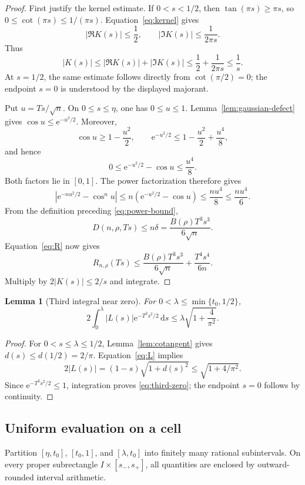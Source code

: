 \documentclass[11pt,a4paper,twoside]{article}
\newcommand{\manualtag}[1]{\tag{#1}}
\newtheorem{lemma}[theorem]{Lemma}
\theoremstyle{remark}
\newcommand{\e}{\mathrm{e}}
\newcommand{\dd}{\,\mathrm{d}}
\newcommand{\abs}[1]{\lvert#1\rvert}
\begin{document}
\begin{proof}
First justify the kernel estimate.  If \(0<s<1/2\), then
\(\tan(\pi s)\ge\pi s\), so
\(0\le\cot(\pi s)\le1/(\pi s)\).  Equation~\eqref{eq:kernel}
gives
\[
 \abs{\Re K(s)}\le\frac12,
 \qquad
 \abs{\Im K(s)}\le\frac1{2\pi s}.
\]
Thus
\[
 \abs{K(s)}
 \le\abs{\Re K(s)}+\abs{\Im K(s)}
 \le\frac12+\frac1{2\pi s}\le\frac1s.
\]
At \(s=1/2\), the same estimate follows directly from
\(\cot(\pi/2)=0\); the endpoint \(s=0\) is understood by the displayed
majorant.

Put \(u=Ts/\sqrt n\).  On \(0\le s\le\eta\), one has
\(0\le u\le1\).  Lemma~\ref{lem:gaussian-defect} gives
\(\cos u\le\e^{-u^2/2}\).  Moreover,
\[
 \cos u\ge1-\frac{u^2}{2},
 \qquad
 \e^{-u^2/2}
 \le
 1-\frac{u^2}{2}+\frac{u^4}{8},
\]
and hence
\[
 0\le\e^{-u^2/2}-\cos u\le\frac{u^4}{8}.
\]
Both factors lie in \([0,1]\).  The power factorization therefore gives
\[
 \left|\e^{-nu^2/2}-\cos^n u\right|
 \le
 n\left(\e^{-u^2/2}-\cos u\right)
 \le\frac{nu^4}{8}\le\frac{nu^4}{6}.
\]
From the definition preceding \eqref{eq:power-bound},
\[
 D(n,\rho,Ts)\le n\delta
 =
 \frac{B(\rho)T^3s^3}{6\sqrt n}.
\]
Equation~\eqref{eq:R} now gives
\[
 R_{n,\rho}(Ts)
 \le
 \frac{B(\rho)T^3s^3}{6\sqrt n}
 +
 \frac{T^4s^4}{6n}.
\]
Multiply by \(2\abs{K(s)}\le2/s\) and integrate.
\end{proof}

\begin{lemma}[Third integral near zero]\label{lem:third-zero}
For \(0<\lambda\le\min\{t_0,1/2\}\),
\begin{equation}
 2\int_0^\lambda
 \abs{L(s)}\e^{-T^2s^2/2}\dd s
 \le
 \lambda\sqrt{1+\frac4{\pi^2}}.
 \manualtag{34}\label{eq:third-zero}
\end{equation}
\end{lemma}

\begin{proof}
For \(0<s\le\lambda\le1/2\), Lemma~\ref{lem:cotangent} gives
\(d(s)\le d(1/2)=2/\pi\).  Equation~\eqref{eq:L} implies
\[
 2\abs{L(s)}
 =
 (1-s)\sqrt{1+d(s)^2}
 \le
 \sqrt{1+4/\pi^2}.
\]
Since \(\e^{-T^2s^2/2}\le1\), integration proves
\eqref{eq:third-zero}; the endpoint \(s=0\) follows by continuity.
\end{proof}

\subsection{Uniform evaluation on a cell}

Partition \([\eta,t_0]\), \([t_0,1]\), and
\([\lambda,t_0]\) into finitely many rational subintervals.
On every proper subrectangle \(I\times[s_-,s_+]\), all quantities are
enclosed by outward-rounded interval arithmetic.
\end{document}
